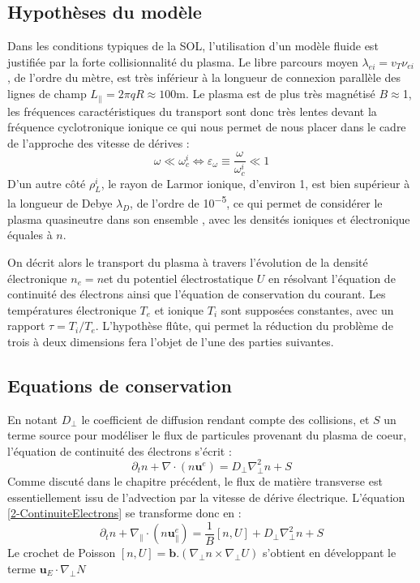 		\subsection{Hypothèses du modèle}
Dans les conditions typiques de la SOL, l'utilisation d'un modèle fluide est justifiée par la
forte collisionnalité du plasma. Le libre
parcours moyen $\lambda_{ei}=v_T \nu_{ei}$, de l'ordre du mètre, est très inférieur à la longueur de connexion
parallèle des lignes de champ $L_{||}=2\pi q R\approx 100\text{m}$.
Le plasma est de plus très magnétisé $B\approx$\unit{1}{\tesla}, les fréquences
caractéristiques du transport sont donc très lentes devant la fréquence cyclotronique ionique
 ce qui nous permet de nous placer dans le cadre de l'approche des vitesse de dérives :
\begin{equation}
	\omega\ll\omega_c^i\Leftrightarrow \varepsilon_\omega\equiv\frac{\omega}{\omega_c^i}\ll 1
\end{equation}
D'un autre côté $\rho_L^i$, le rayon de Larmor ionique, d'environ \unit{1}{\milli\meter}, est bien supérieur à la longueur de 
Debye $\lambda_D$, de l'ordre de \unit{10^{-5}}{\meter}, ce qui permet de considérer le plasma quasineutre dans son ensemble
, avec les densités ioniques et électronique équales à $n$. 

On décrit alors le transport du plasma à travers l'évolution de la densité électronique $n_e=n$et du potentiel électrostatique $U$
en résolvant l'équation de continuité des électrons ainsi que l'équation de conservation du courant. Les températures électronique 
$T_e$ et ionique $T_i$ sont supposées constantes, avec un rapport $\tau=T_i/T_e$.
L'hypothèse flûte, qui permet la réduction du problème de trois à deux dimensions fera l'objet de l'une des parties suivantes.
		\subsection{Equations de conservation}
En notant $D_\perp$ le coefficient de diffusion rendant compte des collisions, et $S$ un terme source pour modéliser le flux 
de particules provenant du plasma de coeur, l'équation de continuité des électrons s'écrit :
\begin{equation}
\label{2-ContinuiteElectrons}
	\partial_t n + \nabla\cdot\left(n\mathbf{u}^e\right) = D_\perp\nabla^2_\perp n + S
\end{equation}
Comme discuté dans le chapitre précédent, le flux de matière transverse est essentiellement issu de l'advection par la vitesse de
dérive électrique. L'équation \ref{2-ContinuiteElectrons} se transforme donc en :
\begin{equation}
	\partial_t n + \nabla_{\parallel}\cdot\left(n\mathbf{u}^e_{\parallel}\right) = \frac{1}{B}\left[n,U\right] + D_\perp\nabla^2_\perp n + S
\end{equation}
Le crochet de Poisson $[n,U]=\mathbf{b}.(\nabla_\perp n\times\nabla_\perp U)$ s'obtient en développant le terme 
$\mathbf{u}_E\cdot\nabla_\perp N$
